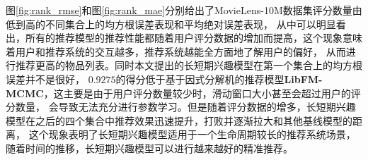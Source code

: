 图\ref{fig:rank_rmse}和图\ref{fig:rank_mae}分别给出了MovieLens-10M数据集评分数量由低到高的不同集合上的均方根误差表现和平均绝对误差表现，
从中可以明显看出，所有的推荐模型的推荐性能都随着用户评分数据的增加而提高，这个现象意味着用户和推荐系统的交互越多，推荐系统越能全方面地了解用户的偏好，
从而进行推荐更高的物品列表。同时本文提出的长短期兴趣模型在第一个集合上的均方根误差并不是很好，
$0.9275$的得分低于基于因式分解机的推荐模型\textbf{LibFM-MCMC}，这主要是由于用户评分数量较少时，滑动窗口大小甚至会超过用户的评分数量，
会导致无法充分进行参数学习。但是随着评分数据的增多，长短期兴趣模型在之后的四个集合中推荐效果迅速提升，打败并逐渐拉大和其他基线模型的距离，
这个现象表明了长短期兴趣模型适用于一个生命周期较长的推荐系统场景，随着时间的推移，长短期兴趣模型可以进行越来越好的精准推荐。


